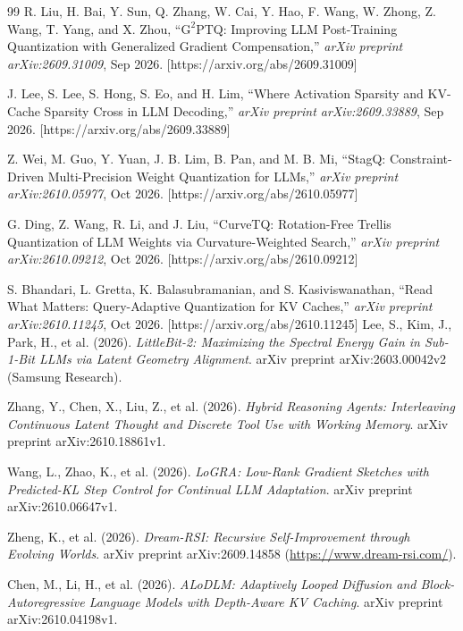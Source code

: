 \documentclass[10pt,a4paper]{article}
\begin{document}
\begin{thebibliography}{99}
R. Liu, H. Bai, Y. Sun, Q. Zhang, W. Cai, Y. Hao, F. Wang, W. Zhong, Z. Wang, T. Yang, and X. Zhou, ``$\text{G}^2\text{PTQ}$: Improving LLM Post-Training Quantization with Generalized Gradient Compensation,'' \emph{arXiv preprint arXiv:2609.31009}, Sep 2026. [https://arxiv.org/abs/2609.31009]

J. Lee, S. Lee, S. Hong, S. Eo, and H. Lim, ``Where Activation Sparsity and KV-Cache Sparsity Cross in LLM Decoding,'' \emph{arXiv preprint arXiv:2609.33889}, Sep 2026. [https://arxiv.org/abs/2609.33889]

Z. Wei, M. Guo, Y. Yuan, J. B. Lim, B. Pan, and M. B. Mi, ``StagQ: Constraint-Driven Multi-Precision Weight Quantization for LLMs,'' \emph{arXiv preprint arXiv:2610.05977}, Oct 2026. [https://arxiv.org/abs/2610.05977]

G. Ding, Z. Wang, R. Li, and J. Liu, ``CurveTQ: Rotation-Free Trellis Quantization of LLM Weights via Curvature-Weighted Search,'' \emph{arXiv preprint arXiv:2610.09212}, Oct 2026. [https://arxiv.org/abs/2610.09212]

S. Bhandari, L. Gretta, K. Balasubramanian, and S. Kasiviswanathan, ``Read What Matters: Query-Adaptive Quantization for KV Caches,'' \emph{arXiv preprint arXiv:2610.11245}, Oct 2026. [https://arxiv.org/abs/2610.11245]
  Lee, S., Kim, J., Park, H., et al. (2026).
  \emph{LittleBit-2: Maximizing the Spectral Energy Gain in Sub-1-Bit LLMs via Latent Geometry Alignment}.
  arXiv preprint arXiv:2603.00042v2 (Samsung Research).

  Zhang, Y., Chen, X., Liu, Z., et al. (2026).
  \emph{Hybrid Reasoning Agents: Interleaving Continuous Latent Thought and Discrete Tool Use with Working Memory}.
  arXiv preprint arXiv:2610.18861v1.

  Wang, L., Zhao, K., et al. (2026).
  \emph{LoGRA: Low-Rank Gradient Sketches with Predicted-KL Step Control for Continual LLM Adaptation}.
  arXiv preprint arXiv:2610.06647v1.

  Zheng, K., et al. (2026).
  \emph{Dream-RSI: Recursive Self-Improvement through Evolving Worlds}.
  arXiv preprint arXiv:2609.14858 (\url{https://www.dream-rsi.com/}).

  Chen, M., Li, H., et al. (2026).
  \emph{ALoDLM: Adaptively Looped Diffusion and Block-Autoregressive Language Models with Depth-Aware KV Caching}.
  arXiv preprint arXiv:2610.04198v1.
\end{thebibliography}
\end{document}
